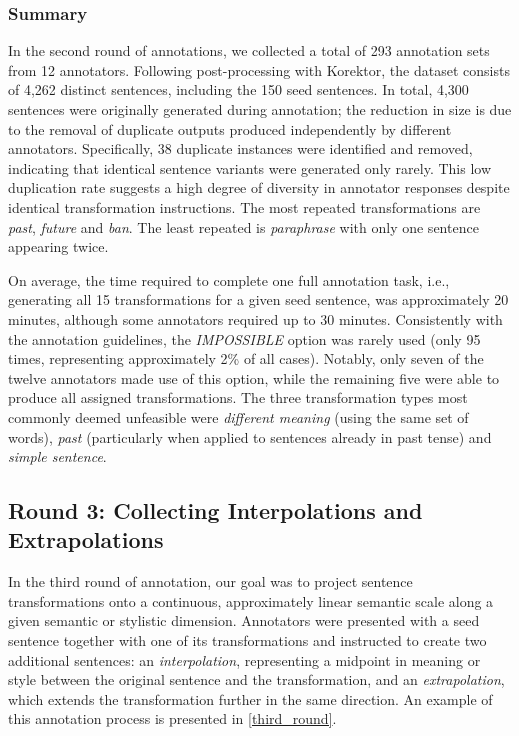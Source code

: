 \subsubsection{Summary}
In the second round of annotations, we collected a total of 293 annotation sets from 12 annotators. Following post-processing with Korektor, the dataset consists of 4,262 distinct sentences, including the 150 seed sentences. In total, 4,300 sentences were originally generated during annotation; the reduction in size is due to the removal of duplicate outputs produced independently by different annotators. Specifically, 38 duplicate instances were identified and removed, indicating that identical sentence variants were generated only rarely. This low duplication rate suggests a high degree of diversity in annotator responses despite identical transformation instructions. The most repeated transformations are  \textit{past}, \textit{future} and \textit{ban}. The least repeated is \textit{paraphrase} with only one sentence appearing twice. 

On average, the time required to complete one full annotation task, i.e., generating all 15 transformations for a given seed sentence, was approximately 20 minutes, although some annotators required up to 30 minutes. Consistently with the annotation guidelines, the \textit{IMPOSSIBLE} option was rarely used (only 95 times, representing approximately 2\% of all cases). Notably, only seven of the twelve annotators made use of this option, while the remaining five were able to produce all assigned transformations. The three transformation types most commonly deemed unfeasible were \textit{different meaning} (using the same set of words), \textit{past} (particularly when applied to sentences already in past tense) and \textit{simple sentence}.


\subsection{Round 3: Collecting Interpolations and Extrapolations}
\label{round3}
In the third round of annotation, our goal was to project sentence transformations onto a continuous, approximately linear semantic scale along a given semantic or stylistic dimension. Annotators were presented with a seed sentence together with one of its transformations and instructed to create two additional sentences: an \textit{interpolation}, representing a midpoint in meaning or style between the original sentence and the transformation, and an \textit{extrapolation}, which extends the transformation further in the same direction. An example of this annotation process is presented in \cref{third_round}. 

